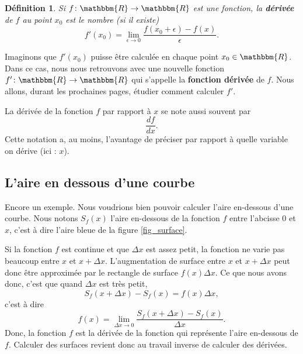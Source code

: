 \documentclass[a4paper,12pt]{book}
\newcommand{\eR}{\mathbbm{R}}
\newcounter{numtho}
\theoremstyle{mes_exemples}	\newtheorem{exemple}[numtho]{Exemple}
\theoremstyle{mes_tho}
\newtheorem{definition}[numtho]{Définition}
\newcommand{\defe}[2]{\textbf{#1}\index{#2}}
\begin{document}
\begin{definition}
Si $f\colon \eR\to \eR$ est une fonction, la \defe{dérivée}{Dérivée d'une fonction} de $f$ au point $x_0$ est le nombre (si il existe)
\begin{equation}
	f'(x_0)=\lim_{\epsilon\to 0}\frac{ f(x_0+\epsilon)-f(x) }{ \epsilon }.
\end{equation}
\end{definition}
Imaginons que $f'(x_0)$ puisse être calculée en chaque point $x_0\in\eR$. Dans ce cas, nous nous retrouvons avec une nouvelle fonction $f'\colon \eR\to \eR$ qui s'appelle la \defe{fonction dérivée}{} de $f$. Nous allons, durant les prochaines pages, étudier comment calculer $f'$.

La dérivée de la fonction $f$ par rapport à $x$ se note aussi souvent par
\begin{equation}
	\frac{ df }{ dx }.
\end{equation}
Cette notation a, au moins, l'avantage de préciser par rapport à quelle variable on dérive (ici : $x$).

					\subsection{L'aire en dessous d'une courbe}		\label{SubSecAirePrimInto}

Encore un exemple. Nous voudrions bien pouvoir calculer l'aire en-dessous d'une courbe. Nous notons $S_f(x)$ l'aire en-dessous de la fonction $f$ entre l'abcisse $0$ et $x$, c'est à dire l'aire bleue de la figure \ref{fig_surface}. 

Si la fonction $f$ est continue et que $\Delta x$ est assez petit, la fonction ne varie pas beaucoup entre $x$ et $x+\Delta x$. L'augmentation de surface entre $x$ et $x+\Delta x$ peut donc être approximée par le rectangle de surface $f(x)\Delta x$. Ce que nous avons donc, c'est que quand $\Delta x$ est très petit,
\begin{equation}
	S_f(x+\Delta x)-S_f(x)=f(x)\Delta x,
\end{equation}
c'est à dire
\begin{equation}
	f(x)=\lim_{\Delta x\to 0}\frac{  S_f(x+\Delta x)-S_f(x)}{ \Delta x }.
\end{equation}
Donc, la fonction $f$ est la dérivée de la fonction qui représente l'aire en-dessous de $f$. Calculer des surfaces revient donc au travail inverse de calculer des dérivées.
\end{document}
